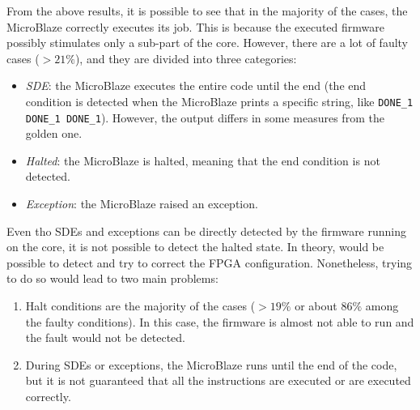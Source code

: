 





From the above results, it is possible to see that in the majority of the cases, the MicroBlaze correctly executes its job. This is because the executed firmware possibly stimulates only a sub-part of the core. However, there are a lot of faulty cases ($> 21\%$), and they are divided into three categories:

\begin{itemize}
    \item \textit{SDE}: the MicroBlaze executes the entire code until the end (the end condition is detected when the MicroBlaze prints a specific string, like \texttt{DONE\_1 DONE\_1 DONE\_1}). However, the output differs in some measures from the golden one.
    \item \textit{Halted}: the MicroBlaze is halted, meaning that the end condition is not detected.
    \item \textit{Exception}: the MicroBlaze raised an exception.
\end{itemize}

Even tho SDEs and exceptions can be directly detected by the firmware running on the core, it is not possible to detect the halted state. In theory, would be possible to detect and try to correct the FPGA configuration. Nonetheless, trying to do so would lead to two main problems:

\begin{enumerate}
    \item Halt conditions are the majority of the cases ($> 19\%$ or about $86\%$ among the faulty conditions). In this case, the firmware is almost not able to run and the fault would not be detected.
    \item During SDEs or exceptions, the MicroBlaze runs until the end of the code, but it is not guaranteed that all the instructions are executed or are executed correctly. 
\end{enumerate}

